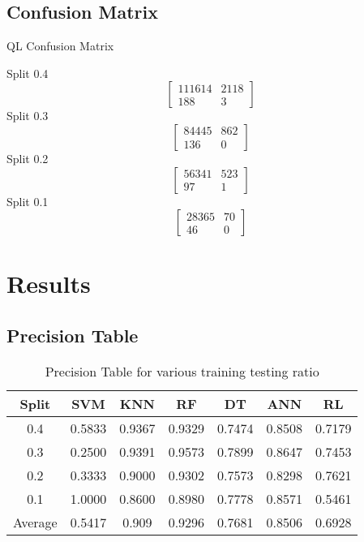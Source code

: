 \documentclass[12pt,a4paper]{report}
\begin{document}
\section{Confusion Matrix}
QL Confusion Matrix\par
Split 0.4
\[
\begin{bmatrix}
  111614 & 2118\\
  188 & 3
\end{bmatrix}
\]
Split 0.3
\[
\begin{bmatrix}
  84445 & 862\\
  136 & 0
\end{bmatrix}
\]
Split 0.2
\[
\begin{bmatrix}
  56341 & 523\\
  97 & 1
\end{bmatrix}
\]
Split 0.1
\[
\begin{bmatrix}
  28365 & 70\\
  46 & 0
\end{bmatrix}
\]


\chapter{Results }
\section{Precision Table}
\begin{table}[!ht]
\centering
\begin{tabular}{|c|c|c|c|c|c|c|}
  \hline
  Split & SVM & KNN & RF & DT & ANN & RL \\
  \hline
  0.4 & 0.5833  & 0.9367 & 0.9329 & 0.7474 & 0.8508 & 0.7179 \\
  \hline
  0.3 & 0.2500 & 0.9391 & 0.9573 & 0.7899 & 0.8647 & 0.7453 \\
  \hline
  0.2 & 0.3333 & 0.9000 & 0.9302 & 0.7573 & 0.8298 & 0.7621 \\
  \hline
  0.1 & 1.0000 & 0.8600 & 0.8980 & 0.7778 & 0.8571 & 0.5461 \\
  \hline
  Average & 0.5417 & 0.909 & 0.9296 & 0.7681 & 0.8506 & 0.6928 \\
  \hline
\end{tabular}
\caption{Precision Table for various training testing ratio}
\label{tab:results}
\end{table}
\end{document}
